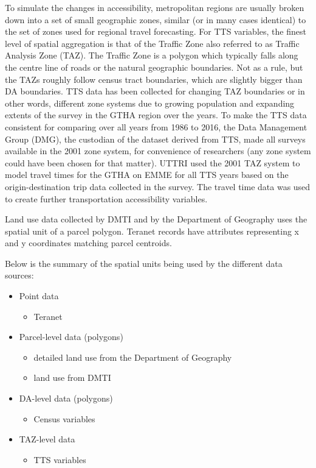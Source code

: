 To simulate the changes in accessibility, metropolitan regions are usually broken down into a set of small geographic zones, similar (or in many cases identical) to the set of zones used for regional travel forecasting.
For TTS variables, the finest level of spatial aggregation is that of the Traffic Zone also referred to as Traffic Analysis Zone (TAZ).
The Traffic Zone is a polygon which typically falls along the centre line of roads or the natural geographic boundaries\cite{DataManagementGroup2019}.
Not as a rule, but the TAZs roughly follow census tract boundaries, which are slightly bigger than DA boundaries.
TTS data has been collected for changing TAZ boundaries or in other words, different zone systems due to growing population and expanding extents of the survey in the GTHA region over the years.
To make the TTS data consistent for comparing over all years from 1986 to 2016, the Data Management Group (DMG), the custodian of the dataset derived from TTS, made all surveys available in the 2001 zone system, for convenience of researchers (any zone system could have been chosen for that matter).
UTTRI used the 2001 TAZ system to model travel times for the GTHA on EMME for all TTS years based on the origin-destination trip data collected in the survey.
The travel time data was used to create further transportation accessibility variables.

Land use data collected by DMTI and by the Department of Geography uses the spatial unit of a parcel polygon.
Teranet records have attributes representing x and y coordinates matching parcel centroids.

\vspace{5mm}

Below is the summary of the spatial units being used by the different data sources:

\begin{itemize}
    \item Point data
    \begin{itemize}
        \item Teranet
    \end{itemize}
    \item Parcel-level data (polygons)
    \begin{itemize}
        \item detailed land use from the Department of Geography
        \item land use from DMTI
    \end{itemize}
    \item DA-level data (polygons)
    \begin{itemize}
        \item Census variables
    \end{itemize}
    \item TAZ-level data
    \begin{itemize}
        \item TTS variables
    \end{itemize}
\end{itemize}

